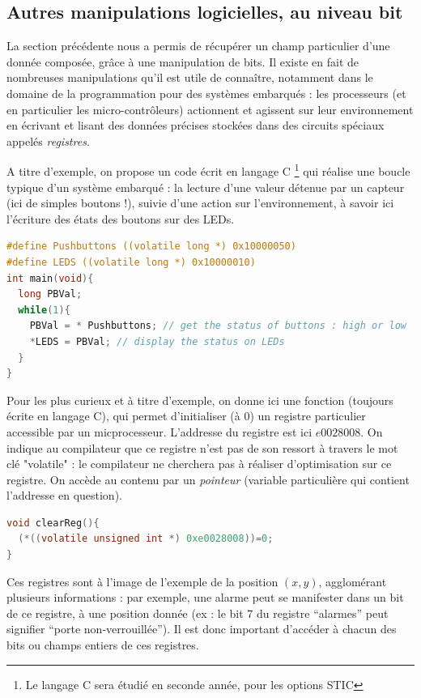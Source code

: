 \subsection{Autres manipulations logicielles, au niveau bit}
La section précédente nous a permis de récupérer un champ particulier d'une donnée composée, grâce à une
 manipulation de bits. Il existe en fait de nombreuses manipulations qu'il est utile de connaître, notamment
 dans le domaine de la programmation pour des systèmes embarqués : les processeurs (et en particulier les micro-contrôleurs)
 actionnent et agissent sur leur environnement en écrivant et lisant des données précises stockées dans des circuits spéciaux appelés
 {\it registres}.

 A titre d'exemple, on propose un code écrit en langage C \footnote{Le langage C sera étudié en seconde année, pour les options STIC}
 qui réalise une boucle typique d'un système embarqué : la lecture d'une valeur détenue par un capteur (ici de simples boutons !),
suivie d'une action sur l'environnement, à savoir ici l'écriture des états des boutons sur des LEDs.

\begin{lstlisting}[language=C,frame=single]
#define Pushbuttons ((volatile long *) 0x10000050)
#define LEDS ((volatile long *) 0x10000010)
int main(void){
  long PBVal;
  while(1){
    PBVal = * Pushbuttons; // get the status of buttons : high or low
    *LEDS = PBVal; // display the status on LEDs
  }
}
\end{lstlisting}

 Pour les plus curieux  et à titre d'exemple, on donne ici une fonction (toujours écrite en langage C), qui permet d'initialiser (à 0) un registre particulier accessible par un micprocesseur.
 L'addresse du registre est ici $e0028008$. On indique au compilateur que ce registre n'est pas de son ressort à travers le mot clé "volatile" : le compilateur ne cherchera pas à réaliser
 d'optimisation sur ce registre. On accède au contenu par un {\it pointeur} (variable particulière qui contient l'addresse en question).

 \begin{lstlisting}[language=C,frame=single]
void clearReg(){
  (*((volatile unsigned int *) 0xe0028008))=0;
}
 \end{lstlisting}

 Ces registres sont à l'image de l'exemple de la position $(x,y)$, agglomérant plusieurs informations
 : par exemple, une alarme peut se manifester dans un bit de ce registre, à une position donnée (ex : le bit 7 du
 registre ``alarmes'' peut signifier ``porte non-verrouillée''). Il est donc important d'accéder à chacun des bits ou
 champs entiers de ces registres.

